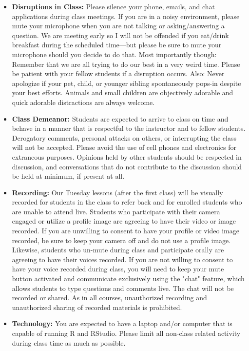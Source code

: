 \documentclass[11pt]{article}
\begin{document}
\begin{itemize}
	\item \textbf{Disruptions in Class:} Please silence your phone, emails, and chat applications during class meetings. If you are in a noisy environment, please mute your microphone when you are not talking or asking/answering a question. We are meeting early so I will not be offended if you eat/drink breakfast during the scheduled time---but please be sure to mute your microphone should you decide to do that. Most importantly though: Remember that we are all trying to do our best in a very weird time. Please be patient with your fellow students if a disruption occurs. Also: Never apologize if your pet, child, or younger sibling spontaneously pops-in despite your best efforts. Animals and small children are objectively adorable and quick adorable distractions are always welcome. 
	\item \textbf{Class Demeanor:} Students are expected to arrive to class on time and behave in a manner that is respectful to the instructor and to fellow students. Derogatory comments, personal attacks on others, or interrupting the class will not be accepted. Please avoid the use of cell phones and electronics for extraneous purposes. Opinions held by other students should be respected in discussion, and conversations that do not contribute to the discussion should be held at minimum, if present at all.
	\item \textbf{Recording:} Our Tuesday lessons (after the first class) will be visually recorded for students in the class to refer back and for enrolled students who are unable to attend live. Students who participate with their camera engaged or utilize a profile image are agreeing to have their video or image recorded.  If you are unwilling to consent to have your profile or video image recorded, be sure to keep your camera off and do not use a profile image. Likewise, students who un-mute during class and participate orally are agreeing to have their voices recorded.  If you are not willing to consent to have your voice recorded during class, you will need to keep your mute button activated and communicate exclusively using the "chat" feature, which allows students to type questions and comments live. The chat will not be recorded or shared. As in all courses, unauthorized recording and unauthorized sharing of recorded materials is prohibited. 
	\item \textbf{Technology:} You are expected to have a laptop and/or computer that is capable of running R and RStudio. Please limit all non-class related activity during class time as much as possible.

\end{itemize}
\end{document}
